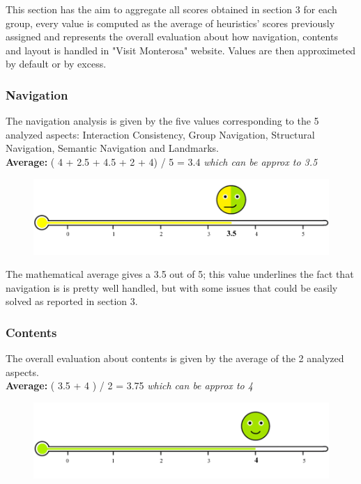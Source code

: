 This section has the aim to aggregate all scores obtained in section 3 for each group, every value is computed as the average of heuristics' scores previously assigned and represents the overall evaluation about how navigation, contents and layout  is handled in "Visit Monterosa" website. Values are then approximeted by default or by excess.

\subsubsection*{Navigation}
The navigation analysis is given by the five values corresponding to the 5 analyzed aspects: Interaction Consistency, Group Navigation, Structural Navigation, Semantic Navigation and Landmarks.\\
\textbf{Average: } ( 4 + 2.5 + 4.5 + 2 + 4) / 5 = 3.4  \emph{which can be approx to 3.5}\\
\begin{figure}[h!]
	\centering
	\begin{minipage}[b]{1\textwidth}
    		\includegraphics[width=1\textwidth]{./assets/layout-navigation-value.png}
	\end{minipage}
\end{figure}
\FloatBarrier

The mathematical average gives a 3.5 out of 5; this value underlines the fact that navigation is is pretty well handled, but with some issues that could be easily solved as reported in section 3.

\subsubsection*{Contents}
The overall evaluation about contents is given by the average of the 2 analyzed aspects.\\
\textbf{Average: } ( 3.5 + 4 ) / 2 = 3.75  \emph{which can be approx to 4}\\
\begin{figure}[h!]
	\centering
	\begin{minipage}[b]{1\textwidth}
    		\includegraphics[width=1\textwidth]{./assets/contents-value.png}
	\end{minipage}
\end{figure}
\FloatBarrier

